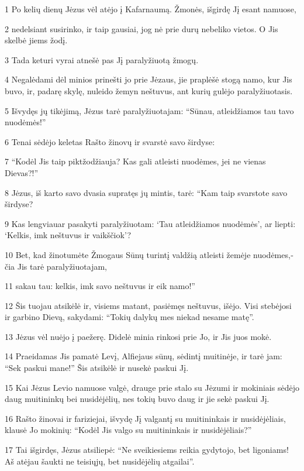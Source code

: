 \par 1 Po kelių dienų Jėzus vėl atėjo į Kafarnaumą. Žmonės, išgirdę Jį esant namuose, 
\par 2 nedelsiant susirinko, ir taip gausiai, jog nė prie durų nebeliko vietos. O Jis skelbė jiems žodį. 
\par 3 Tada keturi vyrai atnešė pas Jį paralyžiuotą žmogų. 
\par 4 Negalėdami dėl minios prinešti jo prie Jėzaus, jie praplėšė stogą namo, kur Jis buvo, ir, padarę skylę, nuleido žemyn neštuvus, ant kurių gulėjo paralyžiuotasis. 
\par 5 Išvydęs jų tikėjimą, Jėzus tarė paralyžiuotajam: “Sūnau, atleidžiamos tau tavo nuodėmės!” 
\par 6 Tenai sėdėjo keletas Rašto žinovų ir svarstė savo širdyse: 
\par 7 “Kodėl Jis taip piktžodžiauja? Kas gali atleisti nuodėmes, jei ne vienas Dievas?!” 
\par 8 Jėzus, iš karto savo dvasia supratęs jų mintis, tarė: “Kam taip svarstote savo širdyse? 
\par 9 Kas lengviau­ar pasakyti paralyžiuotam: ‘Tau atleidžiamos nuodėmės’, ar liepti: ‘Kelkis, imk neštuvus ir vaikščiok’? 
\par 10 Bet, kad žinotumėte Žmogaus Sūnų turintį valdžią atleisti žemėje nuodėmes,­čia Jis tarė paralyžiuotajam,­ 
\par 11 sakau tau: kelkis, imk savo neštuvus ir eik namo!” 
\par 12 Šis tuojau atsikėlė ir, visiems matant, pasiėmęs neštuvus, išėjo. Visi stebėjosi ir garbino Dievą, sakydami: “Tokių dalykų mes niekad nesame matę”. 
\par 13 Jėzus vėl nuėjo į paežerę. Didelė minia rinkosi prie Jo, ir Jis juos mokė. 
\par 14 Praeidamas Jis pamatė Levį, Alfiejaus sūnų, sėdintį muitinėje, ir tarė jam: “Sek paskui mane!” Šis atsikėlė ir nusekė paskui Jį. 
\par 15 Kai Jėzus Levio namuose valgė, drauge prie stalo su Jėzumi ir mokiniais sėdėjo daug muitininkų bei nusidėjėlių, nes tokių buvo daug ir jie sekė paskui Jį. 
\par 16 Rašto žinovai ir fariziejai, išvydę Jį valgantį su muitininkais ir nusidėjėliais, klausė Jo mokinių: “Kodėl Jis valgo su muitininkais ir nusidėjėliais?” 
\par 17 Tai išgirdęs, Jėzus atsiliepė: “Ne sveikiesiems reikia gydytojo, bet ligoniams! Aš atėjau šaukti ne teisiųjų, bet nusidėjėlių atgailai”. 
